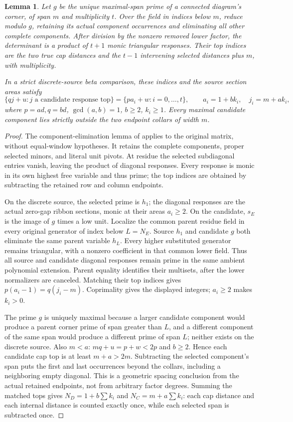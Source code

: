 \documentclass[11pt,a4paper]{amsart}
\numberwithin{equation}{section}
\theoremstyle{plain}
\newtheorem{lemma}[theorem]{Lemma}
\theoremstyle{definition}
\begin{document}
\begin{lemma}\label{lem:corner-spacing}
Let \(g\) be the unique maximal-span prime of a connected diagram's corner, of span \(m\) and multiplicity \(t\).  Over the field in indices below \(m\), reduce modulo \(g\), retaining its actual component occurrences and eliminating all other complete components.  After division by the nonzero removed lower factor, the determinant is a product of \(t+1\) monic triangular responses.  Their top indices are the two true cap distances and the \(t-1\) intervening selected distances plus \(m\), with multiplicity.

In a strict discrete-source beta comparison, these indices and the source section areas satisfy
\[
 \{qj+u:j\text{ a candidate response top}\}
 =\{p a_i+w:i=0,\ldots,t\},\qquad
 a_i=1+bk_i,\quad j_i=m+ak_i,
\]
where \(p=ad,q=bd\), \(\gcd(a,b)=1\), \(b\ge2\), \(k_i\ge1\).  Every maximal candidate component lies strictly outside the two endpoint collars of width \(m\).
\end{lemma}
\begin{proof}
The component-elimination lemma of \cite{Shields2026CornerDescent} applies to the original matrix, without equal-window hypotheses.  It retains the complete components, proper selected minors, and literal unit pivots.  At residue the selected subdiagonal entries vanish, leaving the product of diagonal responses.  Every response is monic in its own highest free variable and thus prime; the top indices are obtained by subtracting the retained row and column endpoints.

On the discrete source, the selected prime is \(h_1\); the diagonal responses are the actual zero-gap ribbon sections, monic at their areas \(a_i\ge2\).  On the candidate, \(s_E\) is the image of \(g\) times a low unit.  Localize the common parent residue field in every original generator of index below \(L=N_E\).  Source \(h_1\) and candidate \(g\) both eliminate the same parent variable \(h_L\).  Every higher substituted generator remains triangular, with a nonzero coefficient in that common lower field.  Thus all source and candidate diagonal responses remain prime in the same ambient polynomial extension.  Parent equality identifies their multisets, after the lower normalizers are canceled.  Matching their top indices gives
\(p(a_i-1)=q(j_i-m)\).
Coprimality gives the displayed integers; \(a_i\ge2\) makes \(k_i>0\).

The prime \(g\) is uniquely maximal because a larger candidate component would produce a parent corner prime of span greater than \(L\), and a different component of the same span would produce a different prime of span \(L\); neither exists on the discrete source.  Also \(m<a\): \(mq+u=p+w<2p\) and \(b\ge2\).  Hence each candidate cap top is at least \(m+a>2m\).  Subtracting the selected component's span puts the first and last occurrences beyond the collars, including a neighboring empty diagonal.  This is a geometric spacing conclusion from the actual retained endpoints, not from arbitrary factor degrees.  Summing the matched tops gives \(N_D=1+b\sum k_i\) and \(N_C=m+a\sum k_i\): each cap distance and each internal distance is counted exactly once, while each selected span is subtracted once.
\end{proof}
\end{document}
